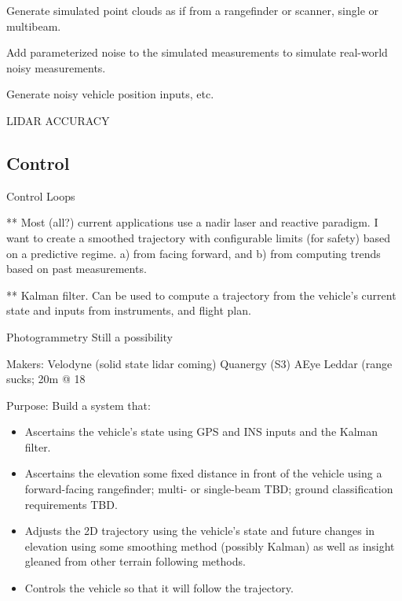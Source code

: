 \documentclass[10pt,a4paper]{report}
\begin{document}
Generate simulated point clouds as if from a rangefinder or scanner, single or multibeam.

Add parameterized noise to the simulated measurements to simulate real-world noisy measurements.

Generate noisy vehicle position inputs, etc.

LIDAR ACCURACY \cite{May2007}




\subsection{Control}

Control Loops








** Most (all?) current applications use a nadir laser and reactive paradigm. I want to create a smoothed trajectory with configurable limits (for safety) based on a predictive regime. a) from facing forward, and b) from computing trends based on past measurements.

** Kalman filter. Can be used to compute a trajectory from the vehicle’s current state and inputs from instruments, and flight plan. 



Photogrammetry
Still a possibility

Makers:
Velodyne (solid state lidar coming)
Quanergy (S3)
AEye
Leddar (range sucks; 20m @ 18%

Purpose: Build a system that:

\begin{itemize}
\item Ascertains the vehicle's state using GPS and INS inputs and the Kalman filter.
\item Ascertains the elevation some fixed distance in front of the vehicle using a forward-facing rangefinder; multi- or single-beam TBD; ground classification requirements TBD.
\item Adjusts the 2D trajectory using the vehicle's state and future changes in elevation using some smoothing method (possibly Kalman) as well as insight gleaned from other terrain following methods.
\item Controls the vehicle so that it will follow the trajectory.
\end{itemize}




\end{document}
